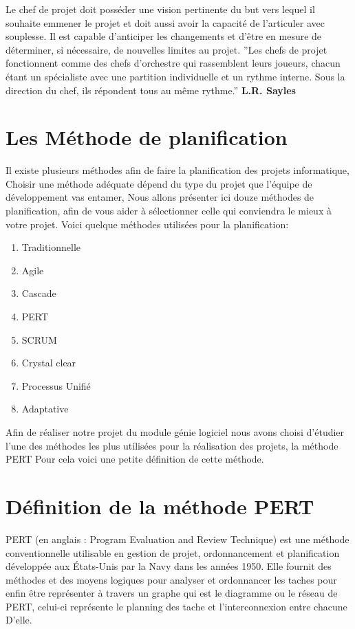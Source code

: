 \documentclass{report}
\begin{document}
\large
 Le chef de projet doit posséder une vision pertinente du but vers lequel il souhaite emmener le projet et doit aussi avoir la capacité de l'articuler avec souplesse.
Il est capable d'anticiper les changements et d'être en mesure de déterminer, si nécessaire, de nouvelles limites au projet.
\newpage
\huge
{}
\vspace*{\fill}
''Les chefs de projet fonctionnent comme des chefs d’orchestre qui rassemblent leurs joueurs, chacun étant un spécialiste avec une partition individuelle et un rythme interne. Sous la direction du chef, ils répondent tous au même rythme.''
\newline
\newline
\textbf{L.R. Sayles}
\vspace*{\fill}



\Large
\newpage
\section{Les Méthode de planification}

Il existe plusieurs méthodes afin de faire la planification des projets informatique, Choisir une méthode adéquate dépend du type du projet que l’équipe de développement vas entamer, Nous allons présenter ici douze méthodes de planification, afin de vous aider à sélectionner celle qui conviendra le mieux à votre projet.
Voici quelque méthodes utilisées pour la planification:

\begin{enumerate}

\item Traditionnelle
\item Agile
\item Cascade
\item PERT
\item SCRUM
\item Crystal clear
\item Processus Unifié 
\item Adaptative
\end{enumerate}


Afin de réaliser notre projet du module génie logiciel nous avons choisi d’étudier l'une des méthodes les plus utilisées pour la réalisation des projets, la méthode PERT
Pour cela voici une petite définition de cette méthode.

\newpage
\section{Définition de la méthode PERT}
PERT (en anglais : Program Evaluation and Review Technique) est une méthode conventionnelle utilisable en gestion de projet, ordonnancement et planification développée aux États-Unis par la Navy dans les années 1950.
Elle fournit des méthodes et des moyens logiques pour analyser et ordonnancer les taches pour enfin être représenter à travers un graphe qui est le diagramme ou le réseau de PERT, celui-ci représente le planning des tache et l’interconnexion entre chacune D’elle.
\end{document}
